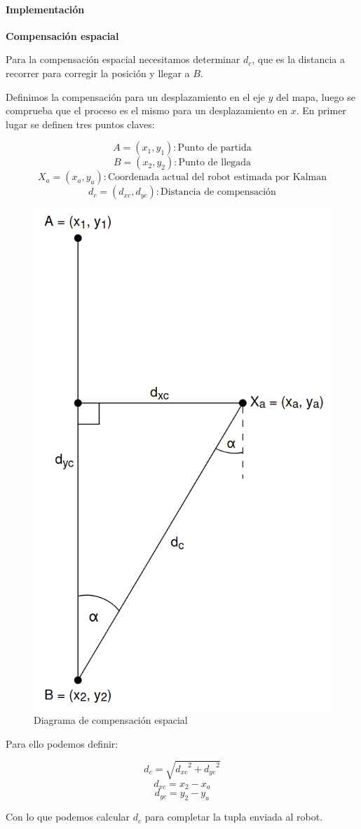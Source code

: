 \paragraph{Implementación} \mbox{} \vspace{8pt}

\textbf{Compensación espacial} \mbox{} \vspace{8pt}

Para la compensación espacial necesitamos determinar $d_c$, que es la distancia a recorrer para corregir la posición y llegar a $B$.

Definimos la compensación para un desplazamiento en el eje $y$ del mapa, luego se comprueba que el proceso es el mismo para un desplazamiento en $x$. En primer lugar se definen tres puntos claves:

$$ A = (x_1, y_1) : \text{Punto de partida} $$
$$ B = (x_2, y_2) : \text{Punto de llegada} $$
$$ X_a = (x_a, y_a) : \text{Coordenada actual del robot estimada por Kalman} $$
$$ d_c = (d_{xc}, d_{yc}) : \text{Distancia de compensación} $$

\begin{figure}[H]
    \centering
    \includegraphics[width=0.4\linewidth]{images/compensacion_vector_distancia_kalman.png}
    \caption{Diagrama de compensación espacial}
    \label{fig:diagcompespacial}
\end{figure}

Para ello podemos definir:

$$ d_c = \sqrt{ {d_{xc}}^2 + {d_{yc}}^2 } $$
$$ d_{xc} = x_2 - x_a $$
$$ d_{yc} = y_2 - y_a $$

Con lo que podemos calcular $d_c$ para completar la tupla enviada al robot.

